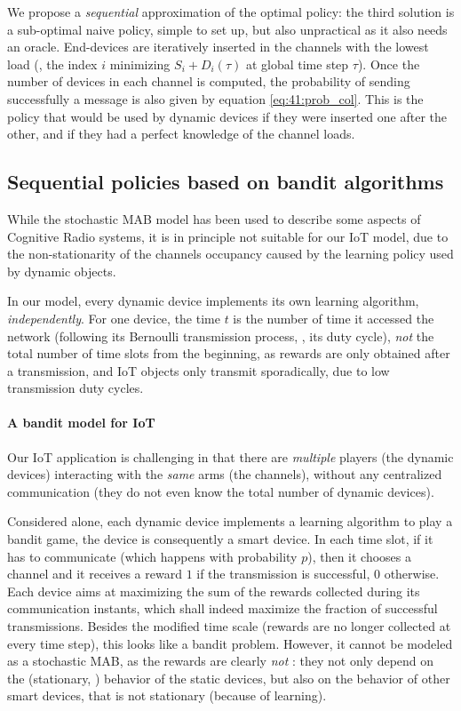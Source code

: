 We propose a \emph{sequential} approximation of the optimal policy:
the third solution is a sub-optimal naive policy, simple to set up, but also unpractical as it also needs an oracle.
End-devices are iteratively inserted in the channels with the lowest load (\ie, the index $i$ minimizing $S_i + D_i(\tau)$ at global time step $\tau$). Once the number of devices in each channel is computed, the probability of sending successfully a message is also given by equation \eqref{eq:41:prob_col}.
This is the policy that would be used by dynamic devices if they were inserted one after the other, and if they had a perfect knowledge of the channel loads.


\subsection{Sequential policies based on bandit algorithms}
\label{sub:41:sequentialPolicies}

While the stochastic MAB model has been used to describe some aspects of Cognitive Radio systems, it is in principle not suitable for our IoT model, due to the non-stationarity of the channels occupancy caused by the learning policy used by dynamic objects.

In our model, every dynamic device implements its own learning algorithm, \emph{independently}.
For one device, the time $t$ is the number of time it accessed the network (following its Bernoulli transmission process, \ie, its duty cycle), \emph{not} the total number of time slots from the beginning, as rewards are only obtained after a transmission, and IoT objects only transmit sporadically, due to low transmission duty cycles.


\paragraph{A bandit model for IoT}

Our IoT application is challenging in that there are \emph{multiple} players (the dynamic devices) interacting with the \emph{same} arms (the channels), without any centralized communication (they do not even know the total number of dynamic devices).

Considered alone, each dynamic device implements a learning algorithm to play a bandit game, the device is consequently a smart device. In each time slot, if it has to communicate (which happens with probability $p$), then it chooses a channel and it receives a reward $1$ if the transmission is successful, $0$ otherwise.
Each device aims at maximizing the sum of the rewards collected during its communication instants, which shall indeed maximize the fraction of successful transmissions. Besides the modified time scale (rewards are no longer collected at every time step), this looks like a bandit problem.
However, it cannot be modeled as a stochastic MAB, as the rewards are clearly \emph{not} \iid: they not only depend on the (stationary, \iid) behavior of the static devices, but also on the behavior of other smart devices, that is not stationary (because of learning).

